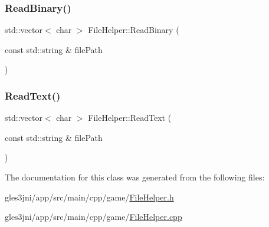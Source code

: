 \subsubsection{\texorpdfstring{Read\+Binary()}{ReadBinary()}}
{\footnotesize\ttfamily std\+::vector$<$ char $>$ File\+Helper\+::\+Read\+Binary (\begin{DoxyParamCaption}\item[{const std\+::string \&}]{file\+Path }\end{DoxyParamCaption})\hspace{0.3cm}{\ttfamily [static]}}

\mbox{\label{class_file_helper_ae30d0ce6ab8d931a39d00568c8e96963}} 
\subsubsection{\texorpdfstring{Read\+Text()}{ReadText()}}
{\footnotesize\ttfamily std\+::vector$<$ char $>$ File\+Helper\+::\+Read\+Text (\begin{DoxyParamCaption}\item[{const std\+::string \&}]{file\+Path }\end{DoxyParamCaption})\hspace{0.3cm}{\ttfamily [static]}}



The documentation for this class was generated from the following files\+:\begin{DoxyCompactItemize}
\item 
gles3jni/app/src/main/cpp/game/\hyperlink{_file_helper_8h}{File\+Helper.\+h}\item 
gles3jni/app/src/main/cpp/game/\hyperlink{_file_helper_8cpp}{File\+Helper.\+cpp}\end{DoxyCompactItemize}
